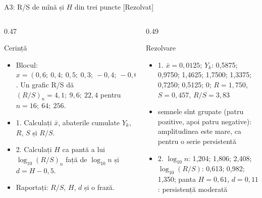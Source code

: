 \begin{frame}{A3: R/S de mînă și $H$ din trei puncte [Rezolvat]}
\itemsize{\scriptsize}
\begin{columns}[T]
\begin{column}{0.47\textwidth}
\begin{block}{Cerință}
\begin{itemize}
    \item Blocul: $x = (0{,}6;\ 0{,}4;\ 0{,}5;\ 0{,}3;\ -0{,}4;\ -0{,}6;\ -0{,}2;\ -0{,}5)$. Un grafic R/S dă $(R/S)_n = 4{,}1;\ 9{,}6;\ 22{,}4$ pentru $n = 16;\ 64;\ 256$.
    \item 1. Calculați $\bar x$, abaterile cumulate $Y_k$, $R$, $S$ și $R/S$.
    \item 2. Calculați $H$ ca pantă a lui $\log_{10}(R/S)_n$ față de $\log_{10}n$ și $d = H - 0{,}5$.
    \item Raportați: $R/S$, $H$, $d$ și o frază.
\end{itemize}
\end{block}
\end{column}
\begin{column}{0.49\textwidth}
\begin{exampleblock}{Rezolvare}
\begin{itemize}
    \item 1. $\bar x = 0{,}0125$; $Y_k$: 0{,}5875; 0{,}9750; 1{,}4625; 1{,}7500; 1{,}3375; 0{,}7250; 0{,}5125; 0; $R = 1{,}750$, $S = 0{,}457$, $R/S = 3{,}83$
    \item semnele sînt grupate (patru pozitive, apoi patru negative): amplitudinea este mare, ca pentru o serie persistentă
    \item 2. $\log_{10}n$: 1{,}204; 1{,}806; 2{,}408; $\log_{10}(R/S)$: 0{,}613; 0{,}982; 1{,}350; panta $H = 0{,}61$, $d = 0{,}11$: persistență moderată
\end{itemize}
\end{exampleblock}
\end{column}
\end{columns}
\end{frame}

